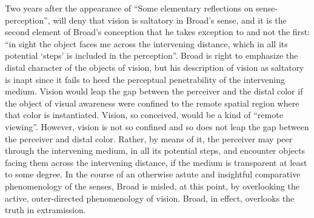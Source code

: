 Two years after the appearance of ``Some elementary reflections on sense-per\-cep\-tion'', \citet[518]{Jonas:1954aa} will deny that vision is saltatory in Broad’s sense, and it is the second element of Broad's conception that he takes exception to and not the first: ``in sight the object faces me across the intervening distance, which in all its potential `steps' is included in the perception''. Broad is right to emphasize the distal character of the objects of vision, but his description of vision as saltatory is inapt since it fails to heed the perceptual penetrability of the intervening medium. Vision would leap the gap between the perceiver and the distal color if the object of visual awareness were confined to the remote spatial region where that color is instantiated. Vision, so conceived, would be a kind of ``remote viewing''. However, vision is not so confined and so does not leap the gap between the perceiver and distal color. Rather, by means of it, the perceiver may peer through the intervening medium, in all its potential steps, and encounter objects facing them across the intervening distance, if the medium is transparent at least to some degree. In the course of an otherwise astute and insightful comparative phenomenology of the senses, Broad is misled, at this point, by overlooking the active, outer-directed phenomenology of vision. Broad, in effect, overlooks the truth in extramission.

